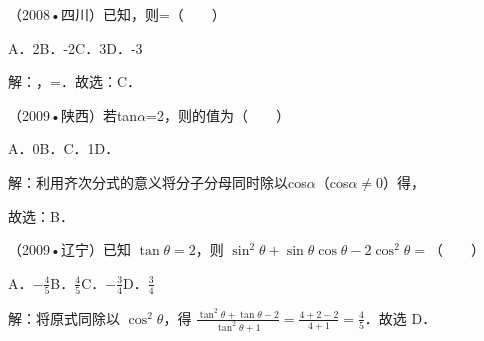 \begin{question}
（2008•四川）已知，则=（　　）\par
A．2\qquad{}B．-2\qquad{}C．3\qquad{}D．-3\par
\begin{solution}
解：，=．故选：C．\par
\end{solution}
\end{question}

\begin{question}
（2009•陕西）若tan\ensuremath{\alpha}=2，则的值为（　　）\par
A．0\qquad{}B．\qquad{}C．1\qquad{}D．\par
\begin{solution}
解：利用齐次分式的意义将分子分母同时除以cos\ensuremath{\alpha}（cos\ensuremath{\alpha}\ensuremath{\ne}0）得，\par
{}\par
故选：B．\par
\end{solution}
\end{question}

\begin{question}
（2009•辽宁）已知 $\tan\theta=2$，则 $\sin^2\theta+\sin\theta\cos\theta-2\cos^2\theta=$（　　）\par
A．$-\frac45$\qquad B．$\frac45$\qquad C．$-\frac34$\qquad D．$\frac34$\par
\begin{solution}
解：将原式同除以 $\cos^2\theta$，得 $\frac{\tan^2\theta+\tan\theta-2}{\tan^2\theta+1}=\frac{4+2-2}{4+1}=\frac45$．故选 D．\par
\end{solution}
\end{question}

